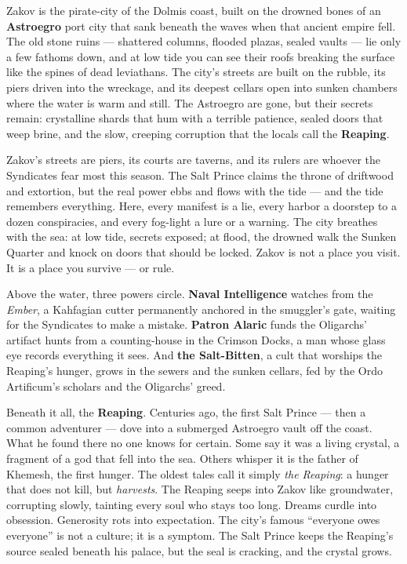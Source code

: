 \vspace{2mm}
\begin{tcolorbox}[colback=black!3,colframe=blue!60!black,title={Theme \& Atmosphere},breakable]
Zakov is the pirate-city of the Dolmis coast, built on the drowned bones of an \textbf{Astroegro} port city that sank beneath the waves when that ancient empire fell. The old stone ruins --- shattered columns, flooded plazas, sealed vaults --- lie only a few fathoms down, and at low tide you can see their roofs breaking the surface like the spines of dead leviathans. The city's streets are built on the rubble, its piers driven into the wreckage, and its deepest cellars open into sunken chambers where the water is warm and still. The Astroegro are gone, but their secrets remain: crystalline shards that hum with a terrible patience, sealed doors that weep brine, and the slow, creeping corruption that the locals call the \textbf{Reaping}.

Zakov's streets are piers, its courts are taverns, and its rulers are whoever the Syndicates fear most this season. The Salt Prince claims the throne of driftwood and extortion, but the real power ebbs and flows with the tide --- and the tide remembers everything. Here, every manifest is a lie, every harbor a doorstep to a dozen conspiracies, and every fog-light a lure or a warning. The city breathes with the sea: at low tide, secrets exposed; at flood, the drowned walk the Sunken Quarter and knock on doors that should be locked. Zakov is not a place you visit. It is a place you survive --- or rule.

Above the water, three powers circle. \textbf{Naval Intelligence} watches from the \textit{Ember}, a Kahfagian cutter permanently anchored in the smuggler's gate, waiting for the Syndicates to make a mistake. \textbf{Patron Alaric} funds the Oligarchs' artifact hunts from a counting-house in the Crimson Docks, a man whose glass eye records everything it sees. And \textbf{the Salt-Bitten}, a cult that worships the Reaping's hunger, grows in the sewers and the sunken cellars, fed by the Ordo Artificum's scholars and the Oligarchs' greed.

Beneath it all, the \textbf{Reaping}. Centuries ago, the first Salt Prince --- then a common adventurer --- dove into a submerged Astroegro vault off the coast. What he found there no one knows for certain. Some say it was a living crystal, a fragment of a god that fell into the sea. Others whisper it is the father of Khemesh, the first hunger. The oldest tales call it simply \textit{the Reaping}: a hunger that does not kill, but \textit{harvests}. The Reaping seeps into Zakov like groundwater, corrupting slowly, tainting every soul who stays too long. Dreams curdle into obsession. Generosity rots into expectation. The city's famous ``everyone owes everyone'' is not a culture; it is a symptom. The Salt Prince keeps the Reaping's source sealed beneath his palace, but the seal is cracking, and the crystal grows.


\end{tcolorbox}
